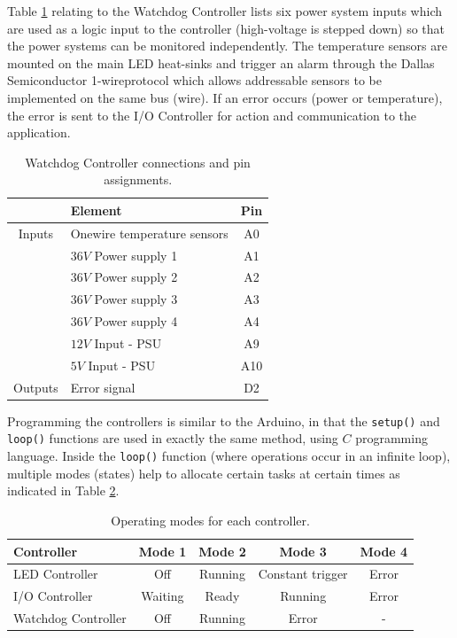 \documentclass[fleqn,twoside]{article}
\begin{document}
Table \ref{tab:watchdog_tasks} relating to the Watchdog Controller lists six power system inputs which are used as a logic input to the controller (high-voltage is stepped down) so that the power systems can be monitored independently. The temperature sensors are mounted on the main LED heat-sinks and trigger an alarm through the Dallas Semiconductor 1-wire\textregistered protocol which allows addressable sensors to be implemented on the same bus (wire). If an error occurs (power or temperature), the error is sent to the I/O Controller for action and communication to the application.

\begin{table}[h]
	\centering
	\caption{Watchdog Controller connections and pin assignments.}
	\label{tab:watchdog_tasks}
	\begin{tabularx}{0.5\linewidth}{cXc}
		\toprule
				& \textbf{Element} & \textbf{Pin} \\[8pt]
		\midrule
		Inputs 	& Onewire temperature sensors 	& A0 \\[4pt]
				& $36V$ Power supply 1 			& A1 \\[4pt]
				& $36V$ Power supply 2 			& A2 \\[4pt]
				& $36V$ Power supply 3 			& A3 \\[4pt]
				& $36V$ Power supply 4 			& A4 \\[4pt]
				& $12V$ Input - PSU 			& A9 \\[4pt]
				& $5V$ Input - PSU 				& A10 \\[4pt]
		
		Outputs	& Error signal			& D2  \\[4pt]
		\bottomrule
		
	\end{tabularx}
\end{table}


Programming the controllers is similar to the Arduino\texttrademark, in that the \texttt{setup()} and \texttt{loop()} functions are used in exactly the same method, using $C$ programming language. Inside the \texttt{loop()} function (where operations occur in an infinite loop), multiple modes (states) help to allocate certain tasks at certain times as indicated in Table \ref{tab:controllino_modes}.
	


\begin{table}[h]
	\centering
	\caption{Operating modes for each controller.}
	\label{tab:controllino_modes}
	\begin{tabularx}{0.7\linewidth}{Xcccc}
		\toprule
		\textbf{Controller} & \textbf{Mode 1} & \textbf{Mode 2} & \textbf{Mode 3} & \textbf{Mode 4} \\[8pt]
		\midrule
		LED Controller 		& Off & Running & Constant trigger & Error \\[4pt]
		I/O Controller 		& Waiting & Ready & Running & Error  \\[4pt]
		Watchdog Controller & Off & Running & Error & -  \\[4pt]
		\bottomrule
	\end{tabularx}
\end{table}
\end{document}
